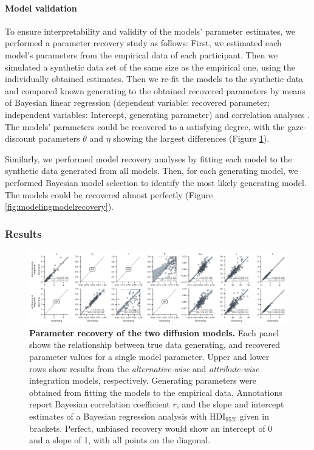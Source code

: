 \documentclass[11pt, a4paper, twocolumn, abstract]{scrartcl}
\begin{document}
\paragraph{Model validation}
To ensure interpretability and validity of the models’ parameter estimates, we performed a parameter recovery study as follows: First, we estimated each model’s parameters from the empirical data of each participant. Then we simulated a synthetic data set of the same size as the empirical one, using the individually obtained estimates. Then we re-fit the models to the synthetic data and compared known generating to the obtained recovered parameters by means of Bayesian linear regression (dependent variable: recovered parameter; independent variables: Intercept, generating parameter) and correlation analyses \parencite{kruschke2013BayesianEstimationSupersedes,lee2013BayesianCognitiveModeling}. The models' parameters could be recovered to a satisfying degree, with the gaze-discount parameters $\theta$ and $\eta$ showing the largest differences (Figure \ref{fig:modelingparameterrecovery}).

Similarly, we performed model recovery analyses by fitting each model to the synthetic data generated from all models. Then, for each generating model, we performed Bayesian model selection \parencite{rigoux2014BayesianModelSelection,stephan2009BayesianModelSelection} to identify the most likely generating model. The models could be recovered almost perfectly (Figure \ref{fig:modelingmodelrecovery}).

\subsubsection*{Results}

\begin{figure}[htbp]
    \centering
    \includegraphics[width=\textwidth]{figures/ddm_recovery_parameters.png}
    \caption{\textbf{Parameter recovery of the two diffusion models.} Each panel shows the relationship between true data generating, and recovered parameter values for a single model parameter. Upper and lower rows show results from the \emph{alternative-wise} and \emph{attribute-wise} integration models, respectively. Generating parameters were obtained from fitting the models to the empirical data. Annotations report Bayesian correlation coefficient $r$, and the slope and intercept estimates of a Bayesian regression analysis with HDI$_{95\%}$ given in brackets. Perfect, unbiased recovery would show an intercept of 0 and a slope of 1, with all points on the diagonal.}
    \label{fig:modelingparameterrecovery}
\end{figure}
\end{document}
